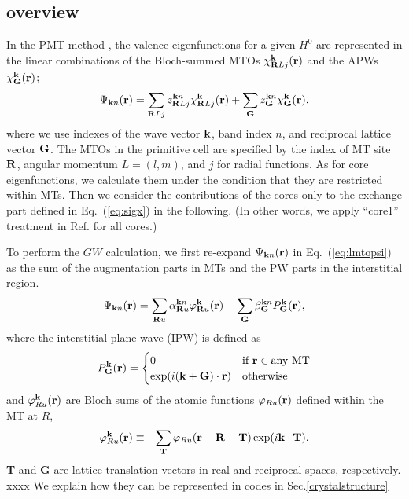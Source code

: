 \documentclass[a4paper,10pt,epsf,fleqn]{article}
\def\Psikn{\Psi_{{\bf k}n}}
\def\Psikn{{\Psi_{{\bf k}n}}}
\def\brl{{\bf R}L}
\def\H0{H^0}
\newcommand{\bfk}{{\bf k}}
\newcommand{\bfr}{{\bf r}}
\newcommand{\bfG}{{\bf G}}
\newcommand{\bfR}{{\bf R}}
\newcommand{\req}[1]{\mbox{Eq.~(\ref{#1})}}
\begin{document}
\subsection{overview}
\label{sec:ov}
In the PMT method \cite{kotani_fusion_2010}, 
the valence eigenfunctions for a given $\H0$ are represented
in the linear combinations of the Bloch-summed MTOs
$\chi^{\bfk}_{\brl{j}}({\bf r})$ and the APWs $\chi^{\bfk}_\bfG (\bfr)$;
\begin{eqnarray}
\label{eq:lmtopsi}
\Psikn(\bfr) = \sum_{\brl{j}} z^{{\bfk}n}_{\brl{j}}
\chi^{\bfk}_{\brl{j}}({\bfr})+ \sum_{\bfG} z^{\bfk n}_{\bfG}
\chi^{\bfk}_\bfG(\bfr),
\label{eqeigen}
\end{eqnarray}
where we use indexes of the wave vector $\bfk$, band index $n$, and 
reciprocal lattice vector $\bfG$. The MTOs in the primitive cell are 
specified by the index of MT site $\bfR$, angular momentum $L=(l,m)$, and $j$ for radial functions. 
As for core eigenfunctions, we calculate them under the condition
that they are restricted within MTs.
Then we consider the contributions of the cores only to the exchange part defined in \req{eq:sigx} in the following. 
(In other words, we apply ``core1'' treatment in 
Ref.\cite{kotani07a} for all cores.)

To perform the $GW$ calculation, we first
re-expand $\Psikn(\bfr)$ in \req{eq:lmtopsi}  
as the sum of the augmentation parts in MTs and the
PW parts in the interstitial region.
\begin{eqnarray}
\Psikn(\bfr)
= \sum_{\bfR u}  \alpha^{{\bfk}n}_{\bfR u} \varphi^{\bf k}_{\bfR u}({\bf r})
 + \sum_{\bf G}  \beta^{{\bfk}n}_{\bf G} P^{\bf k}_{\bf G}({\bf r}),
\label{def:psiexp}
\end{eqnarray}
where the interstitial plane wave (IPW) is defined as
\begin{eqnarray}
P^{\bf k}_{\bf G}({\bf r}) =
\begin{cases}
0    & \text{if {\bf r}} \in \text{any MT} \\
\exp(i ({\bf k+G})\cdot{\bf r})& \text{otherwise}
\end{cases}
\end{eqnarray}
and $\varphi^{\bf k}_{R u}(\bfr)$ are Bloch sums of the atomic functions
$\varphi_{R u}(\bfr)$ defined within the MT at $R$,
\begin{eqnarray}
\varphi^{\bf k}_{R u}({\bf r}) &\equiv& \sum_{\bf T} \varphi_{R u}({\bf r-R-T}) \exp(i {\bf k\cdot{}T}).
\end{eqnarray}
{\bf T} and {\bf G} are lattice translation vectors in real and reciprocal spaces, respectively. 
xxxx We explain how they can be represented in codes
in Sec.\ref{crystalstructure}\\
\end{document}
